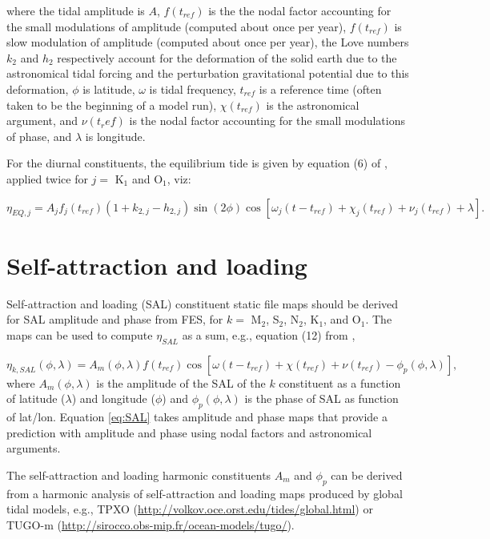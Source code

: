 \documentclass[11pt]{report}
\begin{document}
where the tidal amplitude is $A$, $f(t_{ref})$ is the the nodal factor accounting for the small modulations of amplitude (computed about once per year), $f(t_{ref})$ is slow modulation of amplitude (computed about once per year), the Love numbers $k_2$ and $h_2$ respectively account for the deformation of the solid earth due to the astronomical tidal forcing and the perturbation gravitational potential due to this deformation, $\phi$ is latitude, $\omega$ is tidal frequency, $t_{ref}$ is a reference time (often taken to be the beginning of a model run), $\chi(t_{ref})$ is the astronomical argument, and $\nu(t_ref)$ is the nodal factor accounting for the small modulations of phase, and $\lambda$ is longitude.

For the diurnal constituents, the equilibrium tide is given by equation (6) of \citet{chassignet_primer_2018}, applied twice for $j=$ K$_{1}$ and O$_{1}$, viz:

\begin{equation}
\eta_{EQ,j} = A_j f_j(t_{ref}) (1+k_{2,j}-h_{2,j})\sin(2\phi)\cos\left[\omega_j(t-t_{ref}) + \chi_j(t_{ref}) + \nu_j(t_{ref}) + \lambda \right].
\label{eq:Eq6}
\end{equation}

\section{Self-attraction and loading}
\label{sec:SAL}

Self-attraction and loading (SAL) constituent static file maps should be derived for SAL amplitude and phase from FES, for $k=$ M$_2$, S$_2$, N$_2$, K$_1$, and O$_1$.  The maps can be used to compute $\eta_{SAL}$ as a sum, e.g., equation (12) from \citet{chassignet_primer_2018},

\begin{equation}
   \eta_{k,SAL}(\phi,\lambda) = A_m(\phi,\lambda)f(t_{ref})\cos\left[\omega (t-t_{ref}) + \chi(t_{ref}) + \nu(t_{ref}) - \phi_p(\phi,\lambda)\right],
\label{eq:SAL}
\end{equation}
where $A_m(\phi,\lambda)$ is the amplitude of the SAL of the $k$ constituent as a function of latitude ($\lambda$) and longitude ($\phi$) and $\phi_p(\phi,\lambda)$ is the phase of SAL as function of lat/lon.
Equation \ref{eq:SAL} takes amplitude and phase maps that provide a prediction with amplitude and phase using nodal factors and astronomical arguments.

The self-attraction and loading harmonic constituents $A_m$ and $\phi_p$ can be derived from a harmonic analysis of self-attraction and loading maps produced by global tidal models, e.g., TPXO (\url{http://volkov.oce.orst.edu/tides/global.html}) or TUGO-m (\url{http://sirocco.obs-mip.fr/ocean-models/tugo/}).
\end{document}
